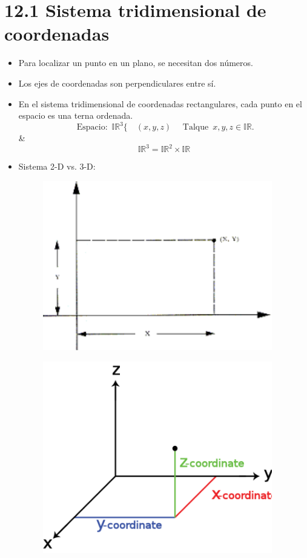 % 
% 


\section{12.1 Sistema tridimensional de coordenadas}
\begin{itemize}
    \item Para localizar un punto en un plano, se necesitan dos números.
    \item Los ejes de coordenadas son perpendiculares entre sí.
    \item En el sistema tridimensional de coordenadas rectangulares, cada punto en el espacio es una terna ordenada.
        \[
          \text{  Espacio:  } \, \mathbb{IR}^3 \{ \quad (x,y,z) \quad \text{  Talque   } \, x,y,z \in \mathbb{IR} .
        \]
        \& 
        \[
          \mathbb{IR}^3 = \mathbb{IR}^2 \times \mathbb{IR}
        \]
    
    \item Sistema 2-D vs. 3-D:
        \begin{figure}[htbp]
            \centering
            \includegraphics[width=10cm]{./../__Imagenes__/2020-01-07_01.png}
            \caption{}
            \label{}
        \end{figure}
        \begin{figure}[htbp]
            \centering
            \includegraphics[width=10cm]{./../__Imagenes__/2020-01-07_02.png}
            \caption{}
            \label{}
        \end{figure}
    

\end{itemize}
